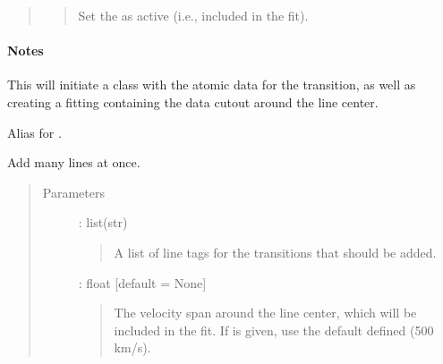 \documentclass[letterpaper,10pt,english]{sphinxmanual}
\begin{document}
\begin{fulllineitems}
\begin{fulllineitems}
\begin{quote}
\begin{description}
\begin{quote}
Set the  as active
(i.e., included in the fit).
\end{quote}

\end{description}\end{quote}
\paragraph{Notes}

This will initiate a  class
with the atomic data for the transition, as well as creating a
fitting {\hyperref[\detokenize{api:regions.Region}]{}} containing the data cutout
around the line center.

\end{fulllineitems}


\begin{fulllineitems}
\label{\detokenize{api:VoigtFit.DataSet.add_lines}}
Alias for .

\end{fulllineitems}


\begin{fulllineitems}
\label{\detokenize{api:VoigtFit.DataSet.add_many_lines}}
Add many lines at once.
\begin{quote}\begin{description}
\item[{Parameters}] \leavevmode
{} : list(str)
\begin{quote}

A list of line tags for the transitions that should be added.
\end{quote}

 : float   {[}default = None{]}
\begin{quote}

The velocity span around the line center, which will be included
in the fit. If  is given, use the default
 defined (500 km/s).
\end{quote}


\end{description}
\end{quote}
\end{fulllineitems}
\end{fulllineitems}
\end{document}
